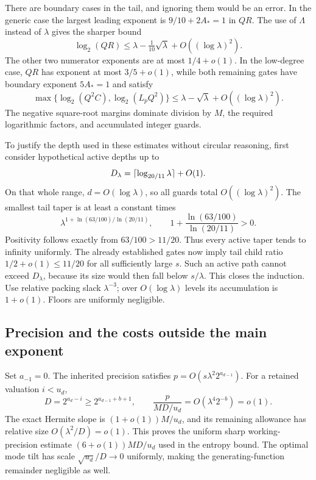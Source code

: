 There are boundary cases in the tail, and ignoring them would be an
error. In the generic case the largest leading exponent is
$9/10+2A_*=1$ in $QR$. The use of $\Lambda$ instead of $\lambda$
gives the sharper bound
\[
 \log_2(QR)\le\lambda-\tfrac1{10}\sqrt\lambda
                        +O((\log\lambda)^2).
\]
The other two numerator exponents are at most $1/4+o(1)$.
In the low-degree case, $QR$ has exponent at most $3/5+o(1)$, while
both remaining gates have boundary exponent $5A_*=1$ and satisfy
\[
 \max\{\log_2(Q^2C),\log_2(L_pQ^2)\}
 \le\lambda-\sqrt\lambda+O((\log\lambda)^2).
\]
The negative square-root margins dominate division by $M$, the required
logarithmic factors, and accumulated integer guards.

To justify the depth used in these estimates without circular reasoning,
first consider hypothetical active depths up to
\[
 D_\lambda=\lceil\log_{20/11}\lambda\rceil+O(1).
\]
On that whole range, $d=O(\log\lambda)$, so all guards total
$O((\log\lambda)^2)$. The smallest tail taper is at least a constant
times
\[
 \lambda^{1+\ln(63/100)/\ln(20/11)},
 \qquad 1+\frac{\ln(63/100)}{\ln(20/11)}>0.
\]
Positivity follows exactly from $63/100>11/20$. Thus every active taper
tends to infinity uniformly. The already established gates now imply
tail child ratio $1/2+o(1)\le11/20$ for all sufficiently large $s$.
Such an active path cannot exceed $D_\lambda$, because its size would
then fall below $s/\lambda$. This closes the induction. Use relative
packing slack $\lambda^{-3}$; over $O(\log\lambda)$ levels its
accumulation is $1+o(1)$. Floors are uniformly negligible.

\subsection{Precision and the costs outside the main exponent}

Set $a_{-1}=0$. The inherited precision satisfies
$p=O(s\lambda^2 2^{a_{d-1}})$. For a retained valuation $i<u_d$,
\[
 D=2^{a_d-i}\ge2^{a_{d-1}+b+1},\qquad
 \frac{p}{MD/u_d}=O(\lambda^4 2^{-b})=o(1).
\]
The exact Hermite slope is $(1+o(1))M/u_d$, and its remaining allowance
has relative size $O(\lambda^2/D)=o(1)$. This proves the uniform sharp
working-precision estimate $(6+o(1))MD/u_d$ used in the entropy bound.
The optimal mode tilt has scale $\sqrt{u_d}/D\to0$ uniformly, making
the generating-function remainder negligible as well.

